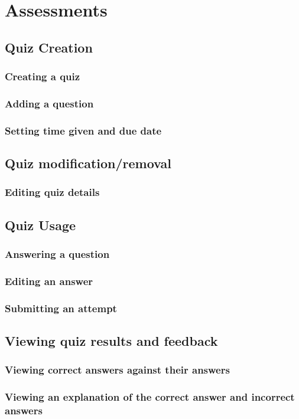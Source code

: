 \section{Assessments}

\subsection{Quiz Creation}

\subsubsection{Creating a quiz}

\subsubsection{Adding a question}

\subsubsection{Setting time given and due date}


\subsection{Quiz modification/removal}

\subsubsection{Editing quiz details}

\subsection{Quiz Usage}

\subsubsection{Answering a question}

\subsubsection{Editing an answer}

\subsubsection{Submitting an attempt}


\subsection{Viewing quiz results and feedback}

\subsubsection{Viewing correct answers against their answers}

\subsubsection{Viewing an explanation of the correct answer and incorrect answers}

